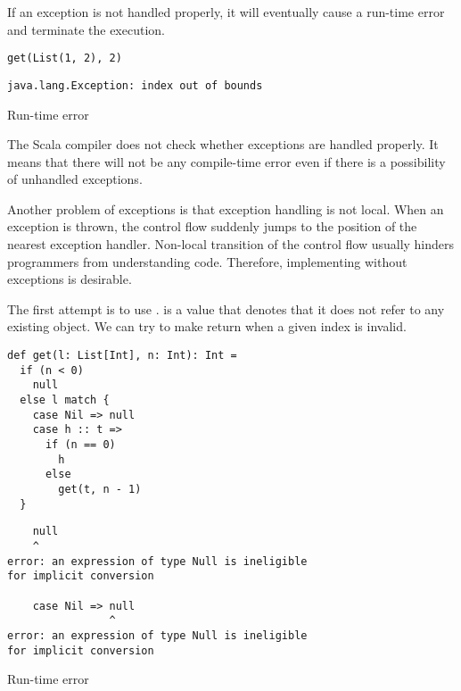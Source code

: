 If an exception is not handled properly, it will eventually cause a run-time
error and terminate the execution.

\begin{verbatim}
get(List(1, 2), 2)
\end{verbatim}
\vspace{-1em}
\begin{mdframed}[hidealllines=true,backgroundcolor=red!10,innerleftmargin=3pt,innerrightmargin=3pt,leftmargin=-3pt,rightmargin=-3pt]
\begin{verbatim}
java.lang.Exception: index out of bounds
\end{verbatim}
\vspace{-2em}
\begin{flushright}
\scriptsize\textsf{Run-time error}
\end{flushright}
\end{mdframed}

The Scala compiler does not check whether exceptions are handled properly.
It means that there will not be any compile-time error even if there is a
possibility of unhandled exceptions.

Another problem of exceptions is that exception handling is not local.
When an exception is thrown, the control flow suddenly jumps to the position of
the nearest exception handler. Non-local transition of the control flow usually
hinders programmers from understanding code.
Therefore, implementing  without exceptions is desirable.

The first attempt is to use .  is a value that denotes that
it does not refer to any existing object. We can try to make  return
 when a given index is invalid.

\begin{verbatim}
def get(l: List[Int], n: Int): Int =
  if (n < 0)
    null
  else l match {
    case Nil => null
    case h :: t =>
      if (n == 0)
        h
      else
        get(t, n - 1)
  }
\end{verbatim}
\vspace{-1em}
\begin{mdframed}[hidealllines=true,backgroundcolor=red!10,innerleftmargin=3pt,innerrightmargin=3pt,leftmargin=-3pt,rightmargin=-3pt]
\begin{verbatim}
    null
    ^
error: an expression of type Null is ineligible
for implicit conversion

    case Nil => null
                ^
error: an expression of type Null is ineligible
for implicit conversion
\end{verbatim}
\vspace{-2em}
\begin{flushright}
\scriptsize\textsf{Run-time error}
\end{flushright}
\end{mdframed}

